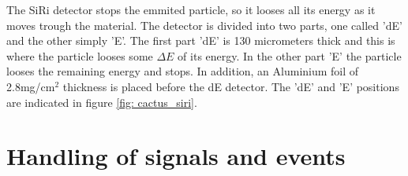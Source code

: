 \documentclass[paper=a4, fontsize=11pt]{scrartcl} %
\begin{document}
The SiRi detector stops the emmited particle, so it looses all its energy as it moves trough the material. The detector is divided into two parts, one called 'dE' and the other simply 'E'. The first part 'dE' is 130 micrometers thick and this is where the particle looses some $\Delta E$ of its energy. In the other part 'E' the particle looses the remaining energy and stops. In addition, an Aluminium foil of 2.8mg/cm${}^2$ thickness is placed before the dE detector. The 'dE' and 'E' positions are indicated in figure \ref{fig: cactus_siri}.









\section*{Handling of signals and events}

\end{document}
